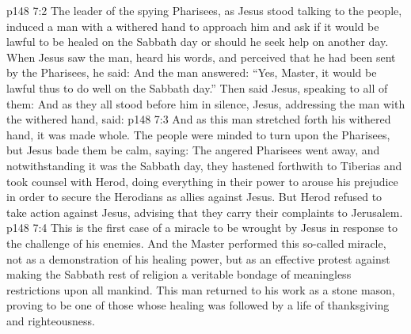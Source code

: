 \vs p148 7:2 The leader of the spying Pharisees, as Jesus stood talking to the people, induced a man with a withered hand to approach him and ask if it would be lawful to be healed on the Sabbath day or should he seek help on another day. When Jesus saw the man, heard his words, and perceived that he had been sent by the Pharisees, he said:  And the man answered: “Yes, Master, it would be lawful thus to do well on the Sabbath day.” Then said Jesus, speaking to all of them:  And as they all stood before him in silence, Jesus, addressing the man with the withered hand, said: 
\vs p148 7:3 And as this man stretched forth his withered hand, it was made whole. The people were minded to turn upon the Pharisees, but Jesus bade them be calm, saying:  The angered Pharisees went away, and notwithstanding it was the Sabbath day, they hastened forthwith to Tiberias and took counsel with Herod, doing everything in their power to arouse his prejudice in order to secure the Herodians as allies against Jesus. But Herod refused to take action against Jesus, advising that they carry their complaints to Jerusalem.
\vs p148 7:4 This is the first case of a miracle to be wrought by Jesus in response to the challenge of his enemies. And the Master performed this so\hyp{}called miracle, not as a demonstration of his healing power, but as an effective protest against making the Sabbath rest of religion a veritable bondage of meaningless restrictions upon all mankind. This man returned to his work as a stone mason, proving to be one of those whose healing was followed by a life of thanksgiving and righteousness.
